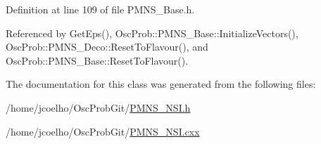 Definition at line 109 of file P\+M\+N\+S\+\_\+\+Base.\+h.



Referenced by Get\+Eps(), Osc\+Prob\+::\+P\+M\+N\+S\+\_\+\+Base\+::\+Initialize\+Vectors(), Osc\+Prob\+::\+P\+M\+N\+S\+\_\+\+Deco\+::\+Reset\+To\+Flavour(), and Osc\+Prob\+::\+P\+M\+N\+S\+\_\+\+Base\+::\+Reset\+To\+Flavour().



The documentation for this class was generated from the following files\+:\begin{DoxyCompactItemize}
\item 
/home/jcoelho/\+Osc\+Prob\+Git/\hyperlink{PMNS__NSI_8h}{P\+M\+N\+S\+\_\+\+N\+S\+I.\+h}\item 
/home/jcoelho/\+Osc\+Prob\+Git/\hyperlink{PMNS__NSI_8cxx}{P\+M\+N\+S\+\_\+\+N\+S\+I.\+cxx}\end{DoxyCompactItemize}
